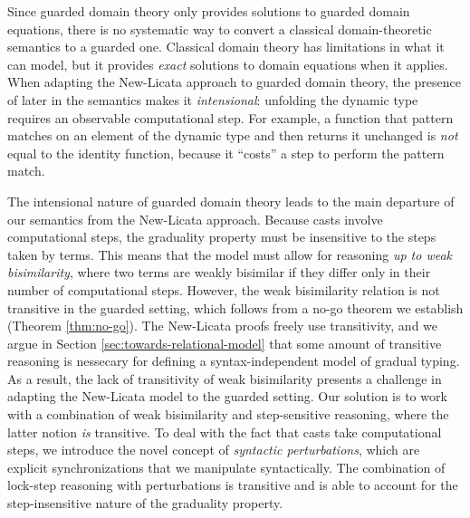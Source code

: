 Since guarded domain theory only provides solutions to guarded domain equations,
there is no systematic way to convert a classical domain-theoretic semantics to
a guarded one.  Classical domain theory has limitations in what it can model,
but it provides \emph{exact} solutions to domain equations when it applies. When
adapting the New-Licata approach to guarded domain theory, the presence of later
in the semantics makes it \emph{intensional}: unfolding the dynamic type
requires an observable computational step. For example, a function that pattern
matches on an element of the dynamic type and then returns it unchanged is
\emph{not} equal to the identity function, because it ``costs'' a step to
perform the pattern match.


The intensional nature of guarded domain theory leads to the main departure of
our semantics from the New-Licata approach. Because casts involve computational
steps, the graduality property must be insensitive to the steps taken by terms.
This means that the model must allow for reasoning \emph{up to weak
bisimilarity}, where two terms are weakly bisimilar if they differ only in their
number of computational steps. However, the weak bisimilarity relation is not
transitive in the guarded setting, which follows from a no-go theorem we
establish (Theorem \ref{thm:no-go}). The New-Licata proofs freely use
transitivity, and we argue in Section \ref{sec:towards-relational-model} that
some amount of transitive reasoning is nessecary for defining a
syntax-independent model of gradual typing. As a result, the lack of
transitivity of weak bisimilarity presents a challenge in adapting the
New-Licata model to the guarded setting. Our solution is to work with a
combination of weak bisimilarity and step-sensitive reasoning, where the latter
notion \emph{is} transitive. To deal with the fact that casts take computational
steps, we introduce the novel concept of \emph{syntactic perturbations}, which
are explicit synchronizations that we manipulate syntactically. The combination
of lock-step reasoning with perturbations is transitive and is able to account
for the step-insensitive nature of the graduality property.



